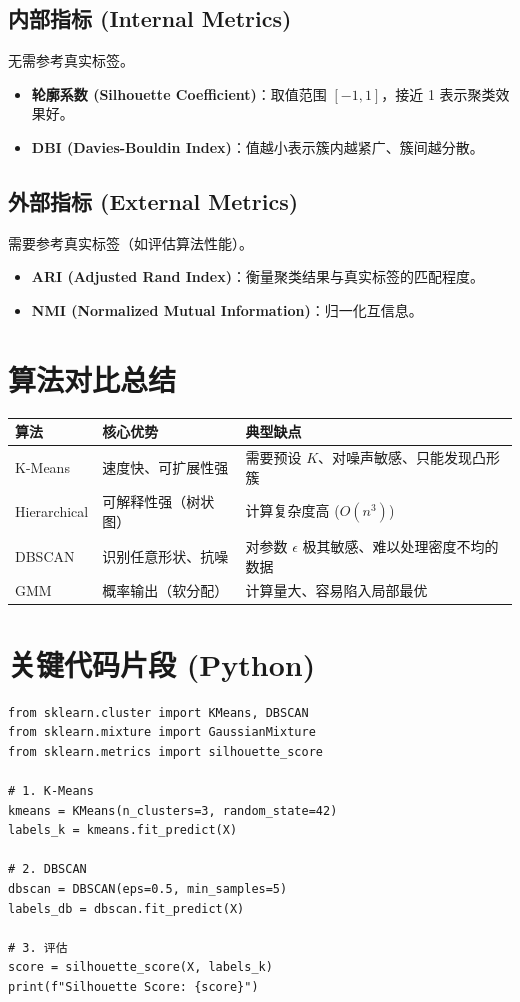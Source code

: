 \documentclass[12pt, a4paper]{article}
\begin{document}
\subsection{内部指标 (Internal Metrics)}
无需参考真实标签。
\begin{itemize}
    \item \textbf{轮廓系数 (Silhouette Coefficient)}：取值范围 $[-1, 1]$，接近 1 表示聚类效果好。
    \item \textbf{DBI (Davies-Bouldin Index)}：值越小表示簇内越紧广、簇间越分散。
\end{itemize}

\subsection{外部指标 (External Metrics)}
需要参考真实标签（如评估算法性能）。
\begin{itemize}
    \item \textbf{ARI (Adjusted Rand Index)}：衡量聚类结果与真实标签的匹配程度。
    \item \textbf{NMI (Normalized Mutual Information)}：归一化互信息。
\end{itemize}

\section{算法对比总结}
\begin{table}[h]
\centering
\begin{tabularx}{\textwidth}{|l|X|X|}
\hline
\textbf{算法} & \textbf{核心优势} & \textbf{典型缺点} \\
\hline
K-Means & 速度快、可扩展性强 & 需要预设 $K$、对噪声敏感、只能发现凸形簇 \\
\hline
Hierarchical & 可解释性强（树状图） & 计算复杂度高 ($O(n^3)$) \\
\hline
DBSCAN & 识别任意形状、抗噪 & 对参数 $\epsilon$ 极其敏感、难以处理密度不均的数据 \\
\hline
GMM & 概率输出（软分配） & 计算量大、容易陷入局部最优 \\
\hline
\end{tabularx}
\end{table}

\section{关键代码片段 (Python)}
\begin{lstlisting}
from sklearn.cluster import KMeans, DBSCAN
from sklearn.mixture import GaussianMixture
from sklearn.metrics import silhouette_score

# 1. K-Means
kmeans = KMeans(n_clusters=3, random_state=42)
labels_k = kmeans.fit_predict(X)

# 2. DBSCAN
dbscan = DBSCAN(eps=0.5, min_samples=5)
labels_db = dbscan.fit_predict(X)

# 3. 评估
score = silhouette_score(X, labels_k)
print(f"Silhouette Score: {score}")
\end{lstlisting}
\end{document}
